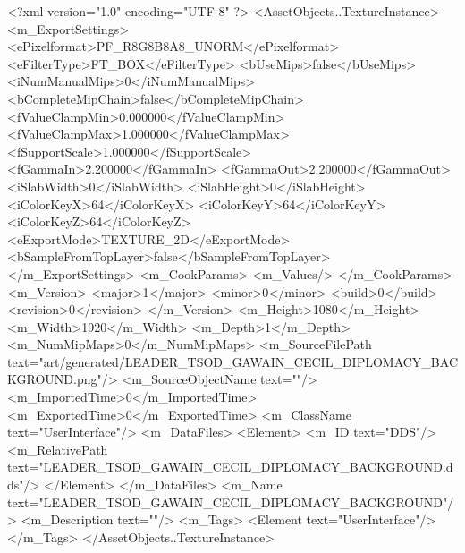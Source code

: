 <?xml version="1.0" encoding="UTF-8" ?>
<AssetObjects..TextureInstance>
	<m_ExportSettings>
		<ePixelformat>PF_R8G8B8A8_UNORM</ePixelformat>
		<eFilterType>FT_BOX</eFilterType>
		<bUseMips>false</bUseMips>
		<iNumManualMips>0</iNumManualMips>
		<bCompleteMipChain>false</bCompleteMipChain>
		<fValueClampMin>0.000000</fValueClampMin>
		<fValueClampMax>1.000000</fValueClampMax>
		<fSupportScale>1.000000</fSupportScale>
		<fGammaIn>2.200000</fGammaIn>
		<fGammaOut>2.200000</fGammaOut>
		<iSlabWidth>0</iSlabWidth>
		<iSlabHeight>0</iSlabHeight>
		<iColorKeyX>64</iColorKeyX>
		<iColorKeyY>64</iColorKeyY>
		<iColorKeyZ>64</iColorKeyZ>
		<eExportMode>TEXTURE_2D</eExportMode>
		<bSampleFromTopLayer>false</bSampleFromTopLayer>
	</m_ExportSettings>
	<m_CookParams>
		<m_Values/>
	</m_CookParams>
	<m_Version>
		<major>1</major>
		<minor>0</minor>
		<build>0</build>
		<revision>0</revision>
	</m_Version>
	<m_Height>1080</m_Height>
	<m_Width>1920</m_Width>
	<m_Depth>1</m_Depth>
	<m_NumMipMaps>0</m_NumMipMaps>
	<m_SourceFilePath text="art/generated/LEADER_TSOD_GAWAIN_CECIL_DIPLOMACY_BACKGROUND.png"/>
	<m_SourceObjectName text=""/>
	<m_ImportedTime>0</m_ImportedTime>
	<m_ExportedTime>0</m_ExportedTime>
	<m_ClassName text="UserInterface"/>
	<m_DataFiles>
		<Element>
			<m_ID text="DDS"/>
			<m_RelativePath text="LEADER_TSOD_GAWAIN_CECIL_DIPLOMACY_BACKGROUND.dds"/>
		</Element>
	</m_DataFiles>
	<m_Name text="LEADER_TSOD_GAWAIN_CECIL_DIPLOMACY_BACKGROUND"/>
	<m_Description text=""/>
	<m_Tags>
		<Element text="UserInterface"/>
	</m_Tags>
</AssetObjects..TextureInstance>
